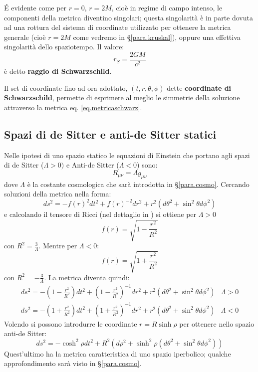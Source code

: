 \'E evidente come per $r=0$, $r=2M$, cioè in regime di campo intenso, le componenti della metrica diventino singolari; questa singolarità è in parte dovuta ad una rottura del sistema di coordinate utilizzato per ottenere la metrica generale (cioè $r=2M$ come vedremo in \S\ref{para.kruskal}), oppure una effettiva singolarità dello spaziotempo.
Il valore:
\begin{equation}
    r_S = \frac{2GM}{c^2}
    \label{eq.raggioschwarz}
\end{equation}
è detto \textbf{raggio di Schwarzschild}.

Il set di coordinate fino ad ora adottato, $(t, r, \theta, \phi)$ dette \textbf{coordinate di Schwarzschild}, permette di esprimere al meglio le simmetrie della soluzione attraverso la metrica eq. \ref{eq.metricaschwarz}.
\subsection{Spazi di de Sitter e anti-de Sitter statici}\label{para.desitterstatici}
Nelle ipotesi di uno spazio statico le equazioni di Einstein che portano agli spazi di de Sitter ($\Lambda >0)$ e Anti-de Sitter ($\Lambda <0$) sono:
\begin{equation*}
    R_{\mu\nu} = \Lambda g_{\mu\nu}
\end{equation*}
dove $\Lambda$ è la costante cosmologica che sarà introdotta in \S\ref{para.cosmo}.
Cercando soluzioni della metrica nella forma:
\begin{equation*}
    ds^2 = -f(r)^2dt^2 + f(r)^{-2}dr^2 +r^2(d\theta^2 + \sin^2\theta d\phi^2)
\end{equation*}
e calcolando il tensore di Ricci (nel dettaglio in \cite{tong}) si ottiene per $\Lambda >0$
\begin{equation*}
    f(r)= \sqrt{1 - \frac{r^2}{R^2}} 
\end{equation*}
con $R^2= \frac{3}{\Lambda}$. Mentre per $\Lambda <0$:
\begin{equation*}
    f(r) = \sqrt{1 + \frac{r^2}{R^2}}
\end{equation*}
con $R^2=-\frac{3}{\Lambda}$. La metrica diventa quindi:
\begin{equation*}
\begin{array}{ll}
      ds^2 = - \left( 1 - \frac{r^2}{R^2} \right)dt^2 + \left( 1 - \frac{r^2}{R^2} \right)^{-1}dr^2 + r^2(d\theta^2 + \sin^2\theta d\phi^2) & \Lambda >0 \\
      ds^2 = - \left( 1 + \frac{r^2}{R^2} \right)dt^2 + \left( 1 + \frac{r^2}{R^2} \right)^{-1}dr^2 + r^2(d\theta^2 + \sin^2\theta d\phi^2) & \Lambda < 0
\end{array}
\end{equation*}
Volendo si possono introdurre le coordinate $r= R\sinh\rho$ per ottenere nello spazio anti-de Sitter:
\begin{equation*}
    ds^2 = - \cosh^2\rho dt^2 + R^2(d\rho^2 + \sinh^2\rho(d\theta^2+ \sin^2\theta d\phi^2))
\end{equation*}
Quest'ultimo ha la metrica caratteristica di uno spazio iperbolico; qualche approfondimento sarà visto in \S\ref{para.cosmo}.

